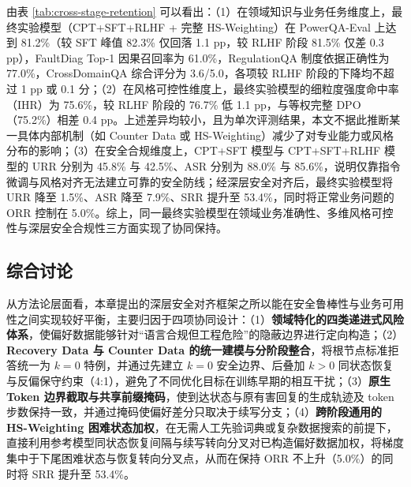 \documentclass[fontset=fandol,type=master,campus=shenzhen,etitleauto=true]{hithesisbook}
\begin{document}
由表 \ref{tab:cross-stage-retention} 可以看出：（1）在领域知识与业务任务维度上，最终实验模型（CPT+SFT+RLHF + 完整 HS-Weighting）在 PowerQA-Eval 上达到 81.2\%（较 SFT 峰值 82.3\% 仅回落 1.1 pp，较 RLHF 阶段 81.5\% 仅差 0.3 pp），FaultDiag Top-1 因果召回率为 61.0\%，RegulationQA 制度依据正确性为 77.0\%，CrossDomainQA 综合评分为 3.6/5.0，各项较 RLHF 阶段的下降均不超过 1 pp 或 0.1 分；（2）在风格可控性维度上，最终实验模型的细粒度强度命中率（IHR）为 75.6\%，较 RLHF 阶段的 76.7\% 低 1.1 pp，与等权完整 DPO（75.2\%）相差 0.4 pp。上述差异均较小，且为单次评测结果，本文不据此推断某一具体内部机制（如 Counter Data 或 HS-Weighting）减少了对专业能力或风格分布的影响；（3）在安全合规维度上，CPT+SFT 模型与 CPT+SFT+RLHF 模型的 URR 分别为 45.8\% 与 42.5\%、ASR 分别为 88.0\% 与 85.6\%，说明仅靠指令微调与风格对齐无法建立可靠的安全防线；经深层安全对齐后，最终实验模型将 URR 降至 1.5\%、ASR 降至 7.9\%、SRR 提升至 53.4\%，同时将正常业务问题的 ORR 控制在 5.0\%。综上，同一最终实验模型在领域业务准确性、多维风格可控性与深层安全合规性三方面实现了协同保持。

\subsection{综合讨论}\label{ux7efcux5408ux8ba8ux8bba-1}

从方法论层面看，本章提出的深层安全对齐框架之所以能在安全鲁棒性与业务可用性之间实现较好平衡，主要归因于四项协同设计：（1）\textbf{领域特化的四类递进式风险体系}，使偏好数据能够针对“语言合规但工程危险”的隐蔽边界进行定向构造；（2）\textbf{Recovery Data 与 Counter Data 的统一建模与分阶段整合}，将根节点标准拒答统一为 $k=0$ 特例，并通过先建立 $k=0$ 安全边界、后叠加 $k>0$ 同状态恢复与反偏保守约束（4:1），避免了不同优化目标在训练早期的相互干扰；（3）\textbf{原生 Token 边界截取与共享前缀掩码}，使到达状态与原有害回复的生成轨迹及 token 步数保持一致，并通过掩码使偏好差分只取决于续写分支；（4）\textbf{跨阶段通用的 HS-Weighting 困难状态加权}，在无需人工先验词典或复杂数据搜索的前提下，直接利用参考模型同状态恢复间隔与续写转向分叉对已构造偏好数据加权，将梯度集中于下尾困难状态与恢复转向分叉点，从而在保持 ORR 不上升（5.0\%）的同时将 SRR 提升至 53.4\%。
\end{document}
